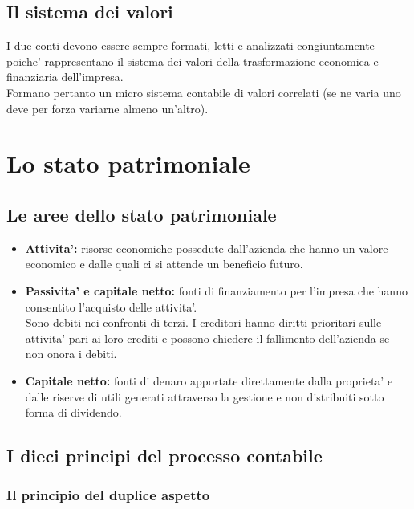 \documentclass{report}
\newcommand\hr{\par\vspace{-.5\ht\strutbox}\noindent\hrulefill\par}
\begin{document}
	\subsection{Il sistema dei valori}
	I due conti devono essere sempre formati, letti e analizzati congiuntamente poiche' rappresentano il sistema dei valori della trasformazione economica e finanziaria dell'impresa.
	\medskip \\Formano pertanto un micro sistema contabile di valori correlati (se ne varia uno deve per forza variarne almeno un'altro).
	\section{Lo stato patrimoniale}
	\subsection{Le aree dello stato patrimoniale}
	\begin{itemize}
		\item \textbf{Attivita':} risorse economiche possedute dall'azienda che hanno un valore economico e dalle quali ci si attende un beneficio futuro.
		\hr
		\item \textbf{Passivita' e capitale netto:} fonti di finanziamento per l'impresa che hanno consentito l'acquisto delle attivita'.
		\medskip \\Sono debiti nei confronti di terzi. I creditori hanno diritti prioritari sulle attivita' pari ai loro crediti e possono chiedere il fallimento dell'azienda se non onora i debiti.
		\item \textbf{Capitale netto:} fonti di denaro apportate direttamente dalla proprieta' e dalle riserve di utili generati attraverso la gestione e non distribuiti sotto forma di dividendo.
	\end{itemize}
	\subsection{I dieci principi del processo contabile}
	\subsubsection{Il principio del duplice aspetto}
	
\end{document}
